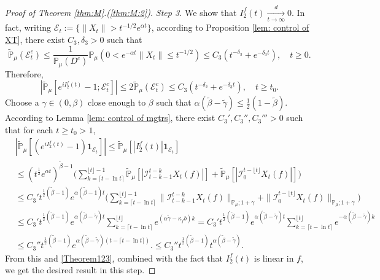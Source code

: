 \documentclass[12pt,a4paper]{amsart}
\theoremstyle{plain}
\theoremstyle{definition}
\numberwithin{equation}{section}
\begin{document}
\begin{proof}[Proof of Theorem \ref{thm:M}.(\ref{thm:M:2})]
  \emph{Step 3.}
  We show that $ I^f_2(t)\xrightarrow[t\to \infty]{d} 0$.
  In fact, writing $\mathcal{E}_t:=\{\|X_t\|>t^{-1/2}e^{\alpha t}\}$, according to Proposition \ref{lem: control of XT}, there exist $C_3, \delta_3>0$ such that
  \begin{equation}
    \mathbb{\widetilde{P}}_{\mu}(\mathcal{E}^c_t)
    \leq \frac{1}{\mathbb{P}_{\mu}(D^c)}\mathbb{P}_{\mu}(0<e^{-\alpha t}\|X_t\|\leq t^{-1/2})\leq C_3( t^{-\delta_3}+e^{-\delta_3 t})
    , \quad t\geq0.
  \end{equation}
  Therefore,
  \begin{equation}
    \label{Theorem123}
    |\mathbb{\widetilde{P}}_{\mu}[e^{i I^f_2(t)}-1;\mathcal{E}^c_t]|
    \leq 2\mathbb{\widetilde{P}}_{\mu}(\mathcal{E}^c_t)
    \leq C_3(t^{-\delta_3}+e^{-\delta_3 t}),
    \quad t\geq t_0.
  \end{equation}
  Choose a $\gamma\in (0,\beta)$ close enough to $\beta$ such that $\alpha(\tilde \beta - \tilde \gamma) \leq \frac{1}{2}(1- \tilde \beta)$.
	According to Lemma \ref{lem: control of mgtrs}, there exist $C_3',C_3'',C_3'''>0$ such that for each $t\geq t_0 >1$, 
  \begin{align}
    & |\mathbb{\widetilde{P}}_{\mu} [ (e^{i I^f_2(t)}-1)\mathbf{1}_{\mathcal{E}_t}]|
      \leq  \mathbb{\widetilde{P}}_{\mu} [ |I^f_2(t)|\mathbf{1}_{\mathcal{E}_t}] \\
    & \leq  (t^{\frac{1}{2}} e^{\alpha t} )^{\tilde \beta - 1}\Big(\sum_{k=\lceil t-\ln t \rceil}^{\lfloor t \rfloor - 1}\mathbb{\widetilde{P}}_{\mu} [| \mathcal{I}_{t-k-1}^{t-k} X_t(f) |] + \mathbb{\widetilde{P}}_{\mu}[| \mathcal{I}_{0}^{t-\lfloor t\rfloor} X_t(f)|]\Big) \\
    & \leq C_3' t^{\frac{1}{2}(\tilde \beta - 1)} e^{\alpha(\tilde \beta - 1)t}\Big(\sum_{k=\lceil t-\ln t \rceil}^{\lfloor t \rfloor - 1}\|\mathcal{I}_{t-k-1}^{t-k} X_t(f) \|_{\mathbb P_\mu; 1+\gamma} + \|\mathcal I_0^{t-\lfloor t \rfloor} X_t(f)\|_{\mathbb P_\mu;1+\gamma}\Big) \\ 
    & \leq C_3' t^{\frac{1}{2}(\tilde \beta - 1)} e^{\alpha (\tilde \beta - \tilde \gamma)t}\sum_{k=\lceil t-\ln t \rceil}^{\lfloor t \rfloor}  e^{(\alpha\tilde \gamma-\kappa_f b)k}
      = C_3' t^{\frac{1}{2}(\tilde \beta - 1)} e^{\alpha(\tilde \beta - \tilde \gamma) t}\sum_{k=\lceil t-\ln t \rceil}^{\lfloor t \rfloor}  e^{-\alpha (\tilde \beta -\tilde \gamma) k}
\\ 
    & \leq C_3'' t^{\frac{1}{2}(\tilde \beta - 1)} e^{\alpha (\tilde \beta - \tilde \gamma)(t - \lceil t - \ln t\rceil)}.
      \leq C_3'' t^{\frac{1}{2}(\tilde \beta - 1)} t^{\alpha (\tilde \beta - \tilde \gamma)}.
  \end{align}
  From this and \eqref{Theorem123}, combined with the fact that $I^f_2(t)$ is linear in $f$, we get the desired result in this step.
  

\end{proof}
\end{document}
